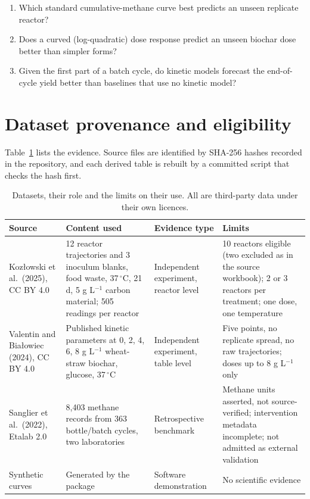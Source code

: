 \documentclass[10pt,a4paper]{article}
\begin{document}
\begin{enumerate}
\item[\textbf{Q1}] Which standard cumulative-methane curve best predicts an unseen replicate reactor?
\item[\textbf{Q2}] Does a curved (log-quadratic) dose response predict an unseen biochar dose better than simpler forms?
\item[\textbf{Q3}] Given the first part of a batch cycle, do kinetic models forecast the end-of-cycle yield better than baselines that use no kinetic model?
\end{enumerate}

\section{Dataset provenance and eligibility}
Table~\ref{tab:data} lists the evidence. Source files are identified by SHA-256 hashes recorded in the repository, and each derived table is rebuilt by a committed script that checks the hash first.

\begin{table}[h]\centering\small
\caption{Datasets, their role and the limits on their use. All are third-party data under their own licences.}\label{tab:data}
\begin{tabular}{@{}p{2.9cm}p{4.6cm}p{2.1cm}p{5.6cm}@{}}\toprule
Source & Content used & Evidence type & Limits \\ \midrule
Koz\l{}owski et al.\ (2025), CC BY 4.0 & 12 reactor trajectories and 3 inoculum blanks, food waste, 37\,$^\circ$C, 21 d, 5 g L$^{-1}$ carbon material; 505 readings per reactor & Independent experiment, reactor level & 10 reactors eligible (two excluded as in the source workbook); 2 or 3 reactors per treatment; one dose, one temperature \\
Valentin and Bia\l{}owiec (2024), CC BY 4.0 & Published kinetic parameters at 0, 2, 4, 6, 8 g L$^{-1}$ wheat-straw biochar, glucose, 37\,$^\circ$C & Independent experiment, table level & Five points, no replicate spread, no raw trajectories; doses up to 8 g L$^{-1}$ only \\
Sanglier et al.\ (2022), Etalab 2.0 & 8,403 methane records from 363 bottle/batch cycles, two laboratories & Retrospective benchmark & Methane units asserted, not source-verified; intervention metadata incomplete; not admitted as external validation \\
Synthetic curves & Generated by the package & Software demonstration & No scientific evidence \\ \bottomrule
\end{tabular}\end{table}
\end{document}
